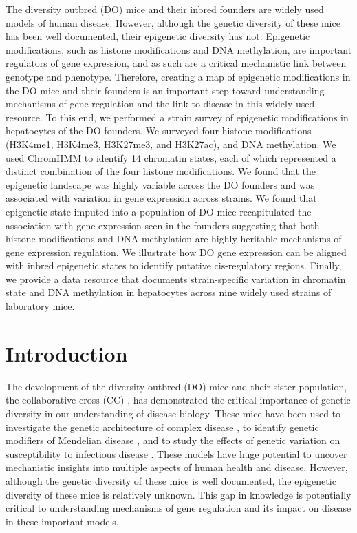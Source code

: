 \documentclass[
  11pt,
]{article}
\begin{document}
The diversity outbred (DO) mice and their inbred founders are widely
used models of human disease. However, although the genetic diversity of
these mice has been well documented, their epigenetic diversity has not.
Epigenetic modifications, such as histone modifications and DNA
methylation, are important regulators of gene expression, and as such
are a critical mechanistic link between genotype and phenotype.
Therefore, creating a map of epigenetic modifications in the DO mice and
their founders is an important step toward understanding mechanisms of
gene regulation and the link to disease in this widely used resource. To
this end, we performed a strain survey of epigenetic modifications in
hepatocytes of the DO founders. We surveyed four histone modifications
(H3K4me1, H3K4me3, H3K27me3, and H3K27ac), and DNA methylation. We used
ChromHMM to identify 14 chromatin states, each of which represented a
distinct combination of the four histone modifications. We found that
the epigenetic landscape was highly variable across the DO founders and
was associated with variation in gene expression across strains. We
found that epigenetic state imputed into a population of DO mice
recapitulated the association with gene expression seen in the founders
suggesting that both histone modifications and DNA methylation are
highly heritable mechanisms of gene expression regulation. We illustrate
how DO gene expression can be aligned with inbred epigenetic states to
identify putative cis-regulatory regions. Finally, we provide a data
resource that documents strain-specific variation in chromatin state and
DNA methylation in hepatocytes across nine widely used strains of
laboratory mice.

\hypertarget{introduction}{%
\section{Introduction}\label{introduction}}

The development of the diversity outbred (DO) mice
\citep{Svenson:2012hq, churchill2012diversity, 
koyuncu2021cxcl1, kurtz2020diversity, bogue2015collaborative, 
kebede2014insights, keller2019gene} and their sister population, the
collaborative cross (CC) \citep{threadgill2011collaborative, 
threadgill2012ten, durrant2011collaborative, mao2015identification, 
graham2021baseline}, has demonstrated the critical importance of genetic
diversity in our understanding of disease biology. These mice have been
used to investigate the genetic architecture of complex disease
\citep{pmid28592500}, to identify genetic modifiers of Mendelian disease
\citep{takemon2021uncovering}, and to study the effects of genetic
variation on susceptibility to infectious disease
\citep{kurtz2020diversity}. These models have huge potential to uncover
mechanistic insights into multiple aspects of human health and disease.
However, although the genetic diversity of these mice is well
documented, the epigenetic diversity of these mice is relatively
unknown. This gap in knowledge is potentially critical to understanding
mechanisms of gene regulation and its impact on disease in these
important models.
\end{document}

